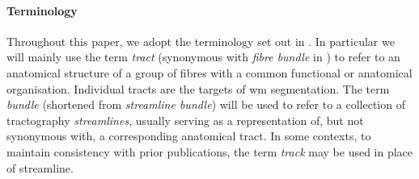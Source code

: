 \paragraph{Terminology}

Throughout this paper, we adopt the terminology set out in \textcite{Cote2013}.
In particular we will mainly use the term \textit{tract} (synonymous with \textit{fibre bundle} in \textcite{Cote2013}) to refer to an anatomical structure of a group of fibres with a common functional or anatomical organisation.
Individual tracts are the targets of \gls{wm} segmentation.
The term \textit{bundle} (shortened from \textit{streamline bundle}) will be used to refer to a collection of tractography \textit{streamlines}, usually serving as a representation of, but not synonymous with, a corresponding anatomical tract.
In some contexts, to maintain consistency with prior publications, the term \textit{track} may be used in place of streamline.
